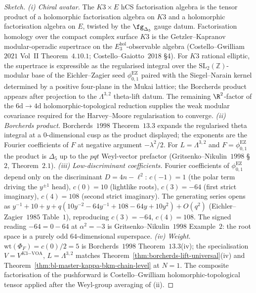 \begin{proof}[Sketch]
\emph{(i) Chiral avatar.} The $K3 \times E$ hCS factorisation algebra is the tensor product of a holomorphic factorisation algebra on $K3$ and a holomorphic factorisation algebra on $E$, twisted by the $\fg_{\Delta_5}$ gauge datum. Factorisation homology over the compact complex surface $K3$ is the Getzler--Kapranov modular-operadic supertrace on the $E_3^{\mathrm{hol}}$-observable algebra (Costello--Gwilliam~$2021$ Vol~II Theorem~$4.10.1$; Costello--Gaiotto~$2018$ \S4). For $K3$ rational elliptic, the supertrace is expressible as the regularised integral over the $\mathrm{SL}_2(\mathbb{Z})$-modular base of the Eichler--Zagier seed \(\phi_{0,1}^{\mathrm{EZ}}\) paired with the Siegel--Narain kernel determined by a positive four-plane in the Mukai lattice; the Borcherds product appears after projection to the \(\Lambda^{3,2}\) theta-lift datum. The remaining $\R^2$-factor of the $6\mathrm{d} \to 4\mathrm{d}$ holomorphic-topological reduction supplies the weak modular covariance required for the Harvey--Moore regularisation to converge.
\emph{(ii) Borcherds product.} Borcherds~$1998$ Theorem~$13.3$ expands the regularised theta integral at a $0$-dimensional cusp as the product displayed; the exponents are the Fourier coefficients of $F$ at negative argument $-\lambda^2/2$. For \(L=\Lambda^{3,2}\) and \(F=\phi_{0,1}^{\mathrm{EZ}}\) the product is \(\Delta_5\) up to the \(pqt\) Weyl-vector prefactor (Gritsenko--Nikulin~$1998$ \S$2$, Theorem~$2.1$).
\emph{(iii) Low-discriminant coefficients.} Fourier coefficients of \(\phi_{0,1}^{\mathrm{EZ}}\) depend only on the discriminant \(D=4n-\ell^2\): \(c(-1)=1\) (the polar term driving the \(y^{\pm1}\) head), \(c(0)=10\) (lightlike roots), \(c(3)=-64\) (first strict imaginary), \(c(4)=108\) (second strict imaginary). The generating series opens as \(y^{-1} + 10 + y + q(10 y^{-2} - 64 y^{-1} + 108 - 64 y + 10 y^2) + O(q^2)\) (Eichler--Zagier~$1985$ Table~$1$), reproducing \(c(3)=-64\), \(c(4)=108\). The signed reading \(-64=0-64\) at \(\alpha^2=-3\) is Gritsenko--Nikulin~$1998$ Example~$2$: the root space is a purely odd \(64\)-dimensional superspace.
\emph{(iv) Weight.} $\mathrm{wt}(\Phi_F) = c(0)/2 = 5$ is Borcherds~$1998$ Theorem~$13.3$(iv); the specialisation $V = V^{K3\mathrm{-VOA}}$, $L = \Lambda^{3,2}$ matches Theorem~\ref{thm:borcherds-lift-universal}(iv) and Theorem~\ref{thm:bl-master-kappa-bkm-chain-level} at $N=1$. The composite factorisation of the pushforward is Costello--Gwilliam holomorphic-topological tensor applied after the Weyl-group averaging of (ii).
\end{proof}

